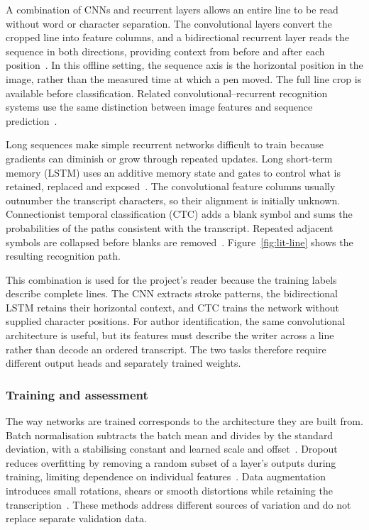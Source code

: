 A combination of CNNs and recurrent layers allows an entire line to be read without word or character separation. The convolutional layers convert the cropped line into feature columns, and a bidirectional recurrent layer reads the sequence in both directions, providing context from before and after each position~\cite[pp.~4--5]{kizilirmak2023}. In this offline setting, the sequence axis is the horizontal position in the image, rather than the measured time at which a pen moved. The full line crop is available before classification. Related convolutional--recurrent recognition systems use the same distinction between image features and sequence prediction~\cite[pp.~2--3]{shi2017}.

Long sequences make simple recurrent networks difficult to train because gradients can diminish or grow through repeated updates. Long short-term memory (LSTM) uses an additive memory state and gates to control what is retained, replaced and exposed~\cite[pp.~4--5]{graves2013}. The convolutional feature columns usually outnumber the transcript characters, so their alignment is initially unknown. Connectionist temporal classification (CTC) adds a blank symbol and sums the probabilities of the paths consistent with the transcript. Repeated adjacent symbols are collapsed before blanks are removed~\cite[pp.~2--4]{graves2006}. Figure~\ref{fig:lit-line} shows the resulting recognition path.



This combination is used for the project's reader because the training labels describe complete lines. The CNN extracts stroke patterns, the bidirectional LSTM retains their horizontal context, and CTC trains the network without supplied character positions. For author identification, the same convolutional architecture is useful, but its features must describe the writer across a line rather than decode an ordered transcript. The two tasks therefore require different output heads and separately trained weights.

\subsubsection{Training and assessment}
The way networks are trained corresponds to the architecture they are built from. Batch normalisation subtracts the batch mean and divides by the standard deviation, with a stabilising constant and learned scale and offset~\cite[p.~4]{ioffe2015}. Dropout reduces overfitting by removing a random subset of a layer's outputs during training, limiting dependence on individual features~\cite[pp.~1931, 1934]{srivastava2014}. Data augmentation introduces small rotations, shears or smooth distortions while retaining the transcription~\cite{wigington2017}. These methods address different sources of variation and do not replace separate validation data.

